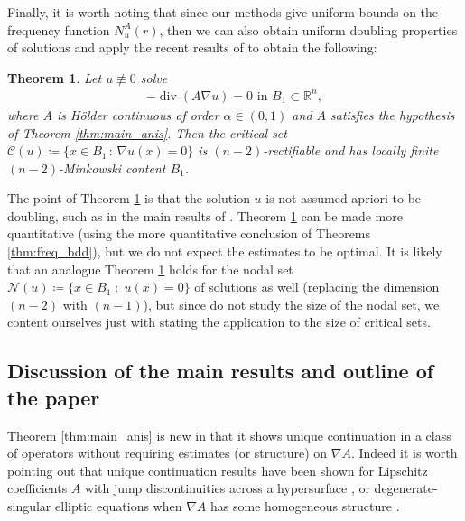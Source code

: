 \documentclass[12pt,leqno]{amsart}
\numberwithin{equation}{section}
\newtheorem{thm}[lemma]{Theorem}
\theoremstyle{definition}
\newcommand{\R}{\mathbb{R}}
\DeclareMathOperator{\divv}{\mathrm{div}}
\begin{document}
Finally, it is worth noting that since our methods give uniform bounds on the frequency function $N_u^A(r)$, then we can also obtain uniform doubling properties of solutions and apply the recent results of \cite{HW23-holder} to obtain the following:
\begin{thm}\label{thm:main_crit}
	Let $u \not \equiv 0$ solve
	\begin{align*}
		-\divv(A \nabla u) = 0 \text{ in } B_1 \subset \R^n,
	\end{align*}
	where $A$ is H\"{o}lder continuous of order $\alpha \in (0,1)$ and $A$ satisfies the hypothesis of Theorem \ref{thm:main_anis}. Then the critical set $\mathcal{C}(u) \coloneqq \{ x \in B_1 \, : \, \nabla u(x) = 0\}$ is $(n-2)$-rectifiable and has locally finite $(n-2)$-Minkowski content $B_1$.  
\end{thm}
The point of Theorem \ref{thm:main_crit} is that the solution $u$ is not assumed apriori to be doubling, such as in the main results of \cite{HW23-holder}. Theorem \ref{thm:main_crit} can be made more quantitative (using the more quantitative conclusion of Theorems \ref{thm:freq_bdd}), but we do not expect the estimates to be optimal. It is likely that an analogue Theorem \ref{thm:main_crit} holds for the nodal set $\mathcal{N}(u) \coloneqq \{ x \in B_1 \; : \; u(x) = 0\}$ of solutions as well (replacing the dimension $(n-2)$ with $(n-1)$), but since \cite{HW23-holder} do not study the size of the nodal set, we content ourselves just with stating the application to the size of critical sets.

\subsection{Discussion of the main results and outline of the paper}

Theorem \ref{thm:main_anis} is new in that it shows unique continuation in a class of operators without requiring estimates (or structure) on $\nabla A$. Indeed it is worth pointing out that unique continuation results have been shown for Lipschitz coefficients $A$ with jump discontinuities across a hypersurface \cite{LRL13, DCFLVW17, FVW22}, or degenerate-singular elliptic equations when $\nabla A$ has some homogeneous structure \cite{CS07, GSVG14, Yu17, SST20, EJSpreprint}. 
\end{document}
